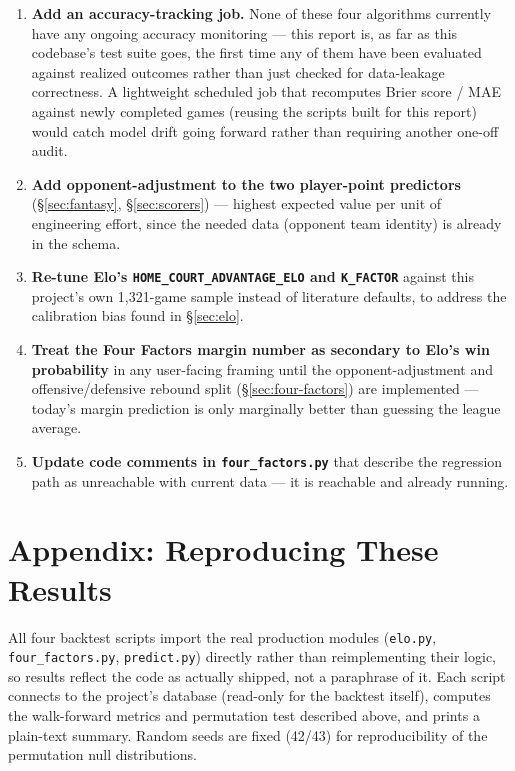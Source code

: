 \documentclass[11pt]{article}
\newcommand{\code}[1]{\allowbreak\texttt{\small #1}\allowbreak}
\begin{document}
\begin{enumerate}
    \item \textbf{Add an accuracy-tracking job.} None of these four algorithms currently have any ongoing
    accuracy monitoring — this report is, as far as this codebase's test suite goes, the first time any of
    them have been evaluated against realized outcomes rather than just checked for data-leakage correctness.
    A lightweight scheduled job that recomputes Brier score / MAE against newly completed games (reusing the
    scripts built for this report) would catch model drift going forward rather than requiring another
    one-off audit.
    \item \textbf{Add opponent-adjustment to the two player-point predictors} (\S\ref{sec:fantasy},
    \S\ref{sec:scorers}) — highest expected value per unit of engineering effort, since the needed data
    (opponent team identity) is already in the schema.
    \item \textbf{Re-tune Elo's \code{HOME\_COURT\_ADVANTAGE\_ELO} and \code{K\_FACTOR}} against this
    project's own 1,321-game sample instead of literature defaults, to address the calibration bias found in
    \S\ref{sec:elo}.
    \item \textbf{Treat the Four Factors margin number as secondary to Elo's win probability} in any
    user-facing framing until the opponent-adjustment and offensive/defensive rebound split
    (\S\ref{sec:four-factors}) are implemented — today's margin prediction is only marginally better than
    guessing the league average.
    \item \textbf{Update code comments in \code{four\_factors.py}} that describe the regression path as
    unreachable with current data — it is reachable and already running.
\end{enumerate}

\section*{Appendix: Reproducing These Results}

All four backtest scripts import the real production modules (\code{elo.py}, \code{four\_factors.py},
\code{predict.py}) directly rather than reimplementing their logic, so results reflect the code as actually
shipped, not a paraphrase of it. Each script connects to the project's database (read-only for the backtest
itself), computes the walk-forward metrics and permutation test described above, and prints a plain-text
summary. Random seeds are fixed (42/43) for reproducibility of the permutation null distributions.
\end{document}

